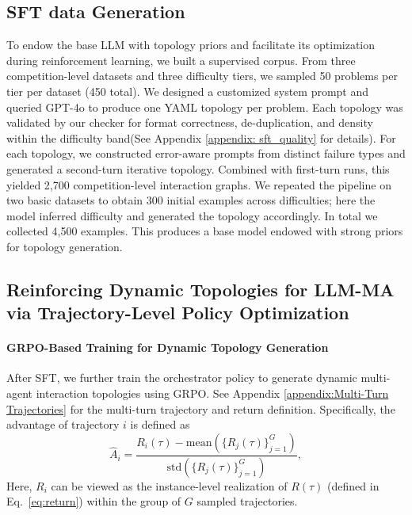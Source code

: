 \documentclass{article}
\theoremstyle{definition}
\begin{document}
\subsection{SFT data Generation}
\label{graph:sft}
To endow the base LLM with topology priors and facilitate its optimization during reinforcement learning, we built a supervised corpus. From three competition-level datasets and three difficulty tiers, we sampled 50 problems per tier per dataset (450 total). We designed a customized system prompt and queried GPT-4o to produce one YAML topology per problem.
Each topology was validated by our checker for format correctness, de-duplication, and density within the difficulty band(See Appendix \ref{appendix: sft_quality} for details). For each topology, we constructed error-aware prompts from distinct failure types and generated a second-turn iterative topology. Combined with first-turn runs, this yielded 2,700 competition-level interaction graphs. We repeated the pipeline on two basic datasets to obtain 300 initial examples across difficulties; here the model inferred difficulty and generated the topology accordingly. In total we collected 4,500 examples. This produces a base model endowed with strong priors for topology generation.
\subsection{Reinforcing Dynamic Topologies for LLM-MA via Trajectory-Level Policy Optimization}
\paragraph{GRPO-Based Training for Dynamic Topology Generation}
After SFT, we further train the orchestrator policy to generate dynamic multi-agent interaction topologies using GRPO. See Appendix \ref{appendix:Multi-Turn Trajectories} for the multi-turn trajectory and return definition.
Specifically, the advantage of trajectory $i$ is defined as
\begin{equation}\label{eq:grpo_adv}
\hat A_i=\frac{R_i(\tau)-\mathrm{mean}\!\left(\{R_j(\tau)\}_{j=1}^{G}\right)}
               {\mathrm{std}\!\left(\{R_j(\tau)\}_{j=1}^{G}\right)},
\end{equation}
Here, $R_i$ can be viewed as the instance-level realization of $R(\tau)$ (defined in Eq.~\ref{eq:return}) within the group of $G$ sampled trajectories.
\end{document}
